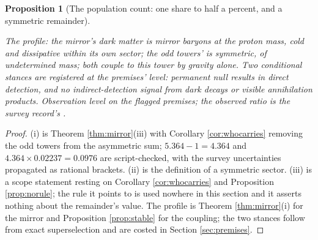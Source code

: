 \documentclass[11pt]{article}
\newtheorem{proposition}[theorem]{Proposition}
\theoremstyle{definition}
\begin{document}
\begin{proposition}[The population count: one share to half a percent, and a symmetric remainder]
\begin{enumerate}
\end{enumerate}
The profile: the mirror's dark matter is mirror baryons at the proton mass, cold and dissipative within its own sector; the odd towers' is symmetric, of undetermined mass; both couple to this tower by gravity alone. Two conditional stances are registered at the premises' level: permanent null results in direct detection, and no indirect-detection signal from dark decays or visible annihilation products. Observation level on the flagged premises; the observed ratio is the survey record's \cite{Planck2018}.
\end{proposition}

\begin{proof}
(i) is Theorem \ref{thm:mirror}(iii) with Corollary \ref{cor:whocarries} removing the odd towers from the asymmetric sum; $5.364 - 1 = 4.364$ and $4.364 \times 0.02237 = 0.0976$ are script-checked, with the survey uncertainties propagated as rational brackets. (ii) is the definition of a symmetric sector. (iii) is a scope statement resting on Corollary \ref{cor:whocarries} and Proposition \ref{prop:norule}; the rule it points to is used nowhere in this section and it asserts nothing about the remainder's value. The profile is Theorem \ref{thm:mirror}(i) for the mirror and Proposition \ref{prop:stable} for the coupling; the two stances follow from exact superselection and are costed in Section \ref{sec:premises}.
\end{proof}
\end{document}
